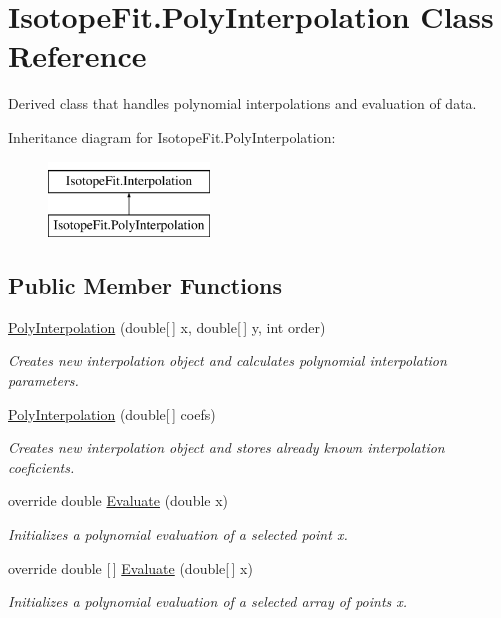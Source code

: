 \hypertarget{class_isotope_fit_1_1_poly_interpolation}{}\section{Isotope\+Fit.\+Poly\+Interpolation Class Reference}
\label{class_isotope_fit_1_1_poly_interpolation}


Derived class that handles polynomial interpolations and evaluation of data.  


Inheritance diagram for Isotope\+Fit.\+Poly\+Interpolation\+:\begin{figure}[H]
\begin{center}
\leavevmode
\includegraphics[height=2.000000cm]{class_isotope_fit_1_1_poly_interpolation}
\end{center}
\end{figure}
\subsection*{Public Member Functions}
\begin{DoxyCompactItemize}
\item 
\mbox{\hyperlink{class_isotope_fit_1_1_poly_interpolation_a0ad4d407eb80baf6c38b3b752048e285}{Poly\+Interpolation}} (double\mbox{[}$\,$\mbox{]} x, double\mbox{[}$\,$\mbox{]} y, int order)
\begin{DoxyCompactList}\small\item\em Creates new interpolation object and calculates polynomial interpolation parameters. \end{DoxyCompactList}\item 
\mbox{\hyperlink{class_isotope_fit_1_1_poly_interpolation_afb26a6b07ac8ca8fb710682c437f6d7f}{Poly\+Interpolation}} (double\mbox{[}$\,$\mbox{]} coefs)
\begin{DoxyCompactList}\small\item\em Creates new interpolation object and stores already known interpolation coeficients. \end{DoxyCompactList}\item 
override double \mbox{\hyperlink{class_isotope_fit_1_1_poly_interpolation_a9638e5613d8a6537b73db6fe37ccd9e8}{Evaluate}} (double x)
\begin{DoxyCompactList}\small\item\em Initializes a polynomial evaluation of a selected point x. \end{DoxyCompactList}\item 
override double \mbox{[}$\,$\mbox{]} \mbox{\hyperlink{class_isotope_fit_1_1_poly_interpolation_ad6c5b40f7a718d934c5a3ed7f55c5eb3}{Evaluate}} (double\mbox{[}$\,$\mbox{]} x)
\begin{DoxyCompactList}\small\item\em Initializes a polynomial evaluation of a selected array of points x. \end{DoxyCompactList}\end{DoxyCompactItemize}

